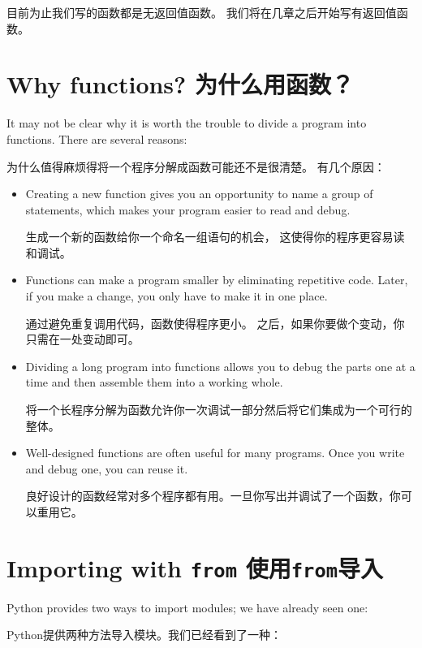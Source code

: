 \documentclass[10pt]{book}
\begin{document}
\begin{CJK}{UTF8}{gbsn}
目前为止我们写的函数都是无返回值函数。
我们将在几章之后开始写有返回值函数。


\section{Why functions? 为什么用函数？}

It may not be clear why it is worth the trouble to divide
a program into functions.  There are several reasons:

为什么值得麻烦得将一个程序分解成函数可能还不是很清楚。
有几个原因：

\begin{itemize}

\item Creating a new function gives you an opportunity to name a group
of statements, which makes your program easier to read and debug.

生成一个新的函数给你一个命名一组语句的机会，
这使得你的程序更容易读和调试。

\item Functions can make a program smaller by eliminating repetitive
code.  Later, if you make a change, you only have
to make it in one place.

通过避免重复调用代码，函数使得程序更小。
之后，如果你要做个变动，你只需在一处变动即可。

\item Dividing a long program into functions allows you to debug the
parts one at a time and then assemble them into a working whole.

将一个长程序分解为函数允许你一次调试一部分然后将它们集成为一个可行的整体。

\item Well-designed functions are often useful for many programs.
Once you write and debug one, you can reuse it.

良好设计的函数经常对多个程序都有用。一旦你写出并调试了一个函数，你可以重用它。

\end{itemize}


\section{Importing with {\tt from} 使用{\tt from}导入}

Python provides two ways to import modules; we have already seen one:

Python提供两种方法导入模块。我们已经看到了一种：


\end{CJK}
\end{document}
